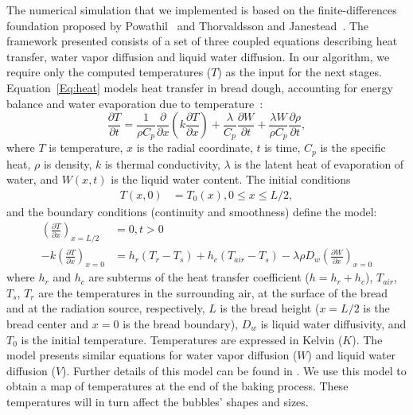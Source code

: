 \documentclass[spanish,a4paper,11pt,oneside,links]{report}
\begin{document}
The numerical simulation that we implemented is based on the finite-differences foundation proposed by Powathil~\cite{Powathil2004} and Thorvaldsson and Janestead~\cite{Thorvaldsson1999}. 
The framework presented consists of a set of three coupled equations describing heat transfer, water vapor diffusion and liquid water diffusion.
In our algorithm, we require only the computed temperatures ($T$) as the input for the next stages.
Equation~\ref{Eq:heat} models heat transfer in bread dough, accounting for energy balance and water evaporation due to temperature~\cite{Thorvaldsson1999}:
%
\begin{equation}
\label{Eq:heat}
\frac{\partial T}{\partial t} = \frac{1}{\rho C_{p}} \frac{\partial}{\partial x} \left ( k \frac{\partial T}{\partial x} \right ) + \frac{\lambda}{C_{p}} \frac{\partial W}{\partial t}+\frac{\lambda W}{ \rho C_{p} }\frac{\partial \rho}{\partial t},
\end{equation}
%
where $T$ is temperature, $x$ is the radial coordinate, $t$ is time, $C_{p}$ is the specific heat, $\rho$ is density, $k$ is thermal conductivity, $\lambda$ is the latent heat of evaporation of water, and $W(x,t)$ is the liquid water content. 
The initial conditions
%
\begin{align*}
T(x,0) &= T_{0}(x), 0\le x \le L/2,
\end{align*}
and the boundary conditions (continuity and smoothness) define the model:
\begin{align*}
\left ( \frac{\partial T}{\partial x} \right )_{x=L/2} &= 0 , t > 0 \\
-k \left ( \frac{\partial T}{\partial x} \right )_{x=0} &= h_{r}(T_{r}-T_{s}) + h_{c}(T_{air}-T_{s}) - \lambda \rho D_{w} \left (\frac{\partial W}{\partial x} \right )_{x=0}
\end{align*}
%
where $h_{r}$ and $h_{c}$ are subterms of the heat transfer coefficient ($h = h_{r}+h_{c}$), $T_{air}$, $T_{s}$, $T_{r}$ are the temperatures in the surrounding air, at the surface of the bread and at the radiation source, respectively, $L$ is the bread height ($x = L/2$ is the bread center and $x = 0$ is the bread boundary), $D_{w}$ is liquid water diffusivity, and $T_{0}$ is the initial temperature. 
Temperatures are expressed in Kelvin ($K$). 
The model presents similar equations for water vapor diffusion ($W$) and  liquid water diffusion ($V$). 
Further details of this model can be found in \cite{Thorvaldsson1999}.
We use this model to obtain a map of temperatures at the end of the baking process. 
These temperatures will in turn affect the bubbles' shapes and sizes.
\end{document}
